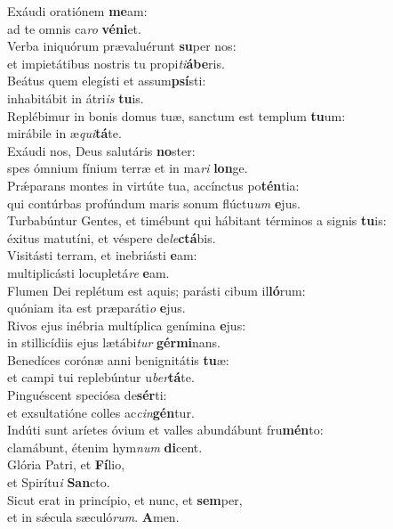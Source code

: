 \evenverse Exáudi oratiónem \textbf{me}am:~\*\\
\evenverse ad te omnis ca\textit{ro} \textbf{vé}\textbf{ni}et.\\
\oddverse Verba iniquórum prævaluérunt \textbf{su}per nos:~\*\\
\oddverse et impietátibus nostris tu propi\textit{ti}\textbf{á}\textbf{be}ris.\\
\evenverse Beátus quem elegísti et assum\textbf{psí}sti:~\*\\
\evenverse inhabitábit in átri\textit{is} \textbf{tu}is.\\
\oddverse Replébimur in bonis domus tuæ, sanctum est templum \textbf{tu}um:~\*\\
\oddverse mirábile in æ\textit{qui}\textbf{tá}te.\\
\evenverse Exáudi nos, Deus salutáris \textbf{no}ster:~\*\\
\evenverse spes ómnium fínium terræ et in ma\textit{ri} \textbf{lon}ge.\\
\oddverse Prǽparans montes in virtúte tua, accínctus po\textbf{tén}tia:~\*\\
\oddverse qui contúrbas profúndum maris sonum flúctu\textit{um} \textbf{e}jus.\\
\evenverse Turbabúntur Gentes, et timébunt qui hábitant términos a signis \textbf{tu}is:~\*\\
\evenverse éxitus matutíni, et véspere de\textit{le}\textbf{ctá}bis.\\
\oddverse Visitásti terram, et inebriásti \textbf{e}am:~\*\\
\oddverse multiplicásti locupletá\textit{re} \textbf{e}am.\\
\evenverse Flumen Dei replétum est aquis; parásti cibum il\textbf{ló}rum:~\*\\
\evenverse quóniam ita est præparáti\textit{o} \textbf{e}jus.\\
\oddverse Rivos ejus inébria multíplica genímina \textbf{e}jus:~\*\\
\oddverse in stillicídiis ejus lætábi\textit{tur} \textbf{gér}\textbf{mi}nans.\\
\evenverse Benedíces corónæ anni benignitátis \textbf{tu}æ:~\*\\
\evenverse et campi tui replebúntur u\textit{ber}\textbf{tá}te.\\
\oddverse Pinguéscent speciósa de\textbf{sér}ti:~\*\\
\oddverse et exsultatióne colles ac\textit{cin}\textbf{gén}tur.\\
\evenverse Indúti sunt aríetes óvium et valles abundábunt fru\textbf{mén}to:~\*\\
\evenverse clamábunt, étenim hym\textit{num} \textbf{di}cent.\\
\oddverse Glória Patri, et \textbf{Fí}lio,~\*\\
\oddverse et Spirítu\textit{i} \textbf{San}cto.\\
\evenverse Sicut erat in princípio, et nunc, et \textbf{sem}per,~\*\\
\evenverse et in sǽcula sæculó\textit{rum}. \textbf{A}men.\\
